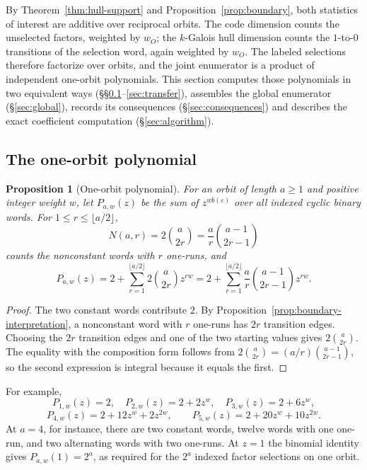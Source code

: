 \documentclass[10pt,a4paper]{article}
\numberwithin{equation}{section}
\theoremstyle{plain}
\newtheorem{proposition}[theorem]{Proposition}
\theoremstyle{definition}
\theoremstyle{remark}
\begin{document}
By Theorem~\ref{thm:hull-support} and Proposition~\ref{prop:boundary}, both
statistics of interest are additive over reciprocal orbits. The code dimension
counts the unselected factors, weighted by $w_O$; the $k$-Galois hull dimension
counts the $1$-to-$0$ transitions of the selection word, again weighted by $w_O$.
The labeled selections therefore factorize over orbits, and the joint enumerator
is a product of independent one-orbit polynomials. This section
computes those polynomials in two equivalent ways
(\S\S\ref{sec:orbit}--\ref{sec:transfer}), assembles the global enumerator
(\S\ref{sec:global}), records its consequences (\S\ref{sec:consequences}) and
describes the exact coefficient computation (\S\ref{sec:algorithm}).

\subsection{The one-orbit polynomial}\label{sec:orbit}

\begin{proposition}[One-orbit polynomial]\label{prop:orbit-poly}
For an orbit of length $a\geq1$ and positive integer weight $w$, let
$P_{a,w}(z)$ be the sum of $z^{wb(\varepsilon)}$ over all indexed cyclic binary
words. For $1\leq r\leq\lfloor a/2\rfloor$,
\[
N(a,r)=2\binom{a}{2r}
 =\frac{a}{r}\binom{a-1}{2r-1}
\]
counts the nonconstant words with $r$ one-runs, and
\begin{equation}\label{eq:orbit-poly}
P_{a,w}(z)=2+
 \sum_{r=1}^{\lfloor a/2\rfloor}
 2\binom{a}{2r}z^{rw}
 =2+
 \sum_{r=1}^{\lfloor a/2\rfloor}
 \frac{a}{r}\binom{a-1}{2r-1}z^{rw}.
\end{equation}
\end{proposition}

\begin{proof}
The two constant words contribute $2$. By
Proposition~\ref{prop:boundary-interpretation}, a nonconstant word with $r$
one-runs has $2r$ transition edges. Choosing the $2r$ transition edges and one of
the two starting values gives $2\binom{a}{2r}$. The equality with the composition
form follows from $2\binom{a}{2r}=(a/r)\binom{a-1}{2r-1}$, so the second
expression is integral because it equals the first.
\end{proof}

For example,
\[
P_{1,w}(z)=2,\quad
P_{2,w}(z)=2+2z^w,\quad
P_{3,w}(z)=2+6z^w,
\]
\[
P_{4,w}(z)=2+12z^w+2z^{2w},\qquad
P_{5,w}(z)=2+20z^w+10z^{2w}.
\]
At $a=4$, for instance, there are two constant words, twelve words with one
one-run, and two alternating words with two one-runs. At $z=1$ the binomial
identity gives $P_{a,w}(1)=2^a$, as required for the $2^a$ indexed factor
selections on one orbit.
\end{document}
